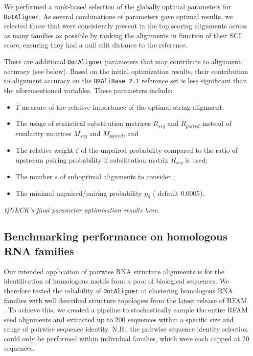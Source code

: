 \documentclass[a4paper,twoside]{article}
\newcommand\dotaligner{\texttt{DotAligner}}
\newcommand\bralibase{\texttt{BRAliBase 2.1}}
\begin{document}
We performed a rank-based selection of the globally optimal parameters for \dotaligner{}. 
As several combinations of parameters gave optimal results, we selected those that were 
consistently present in the top scoring alignments across as many families as possible by 
ranking the alignments in function of their SCI score, ensuring they had a null edit distance 
to the reference.  


There are additional \dotaligner{} parameters that may contribute to alignment 
accuracy (see below). Based on the initial optimization results, their contribution
to alignment accuracy on the \bralibase{} reference set is less significant than the
aforementioned variables. These parameters include: 
\begin{itemize}
	\item $T$ measure of the relative importance of the optimal string alignment.
	\item The usage of statistical substitution matrices $R_{seq}$ and $R_{paired}$ instead of  similarity matrices $M_{seq}$ and $M_{paired}$, and
	\item The relative weight $\zeta$ of the unpaired probability compared to the 
	ratio of upstream pairing probability if substitution matrix $R_{seq}$ is used;
	\item The number $s$ of suboptimal alignments to consider ;
	\item The minimal unpaired/pairing probability $p_0$ ( default 0.0005).
\end{itemize}

\emph{QUECK's final parameter optimisation results here.}

\subsection{Benchmarking performance on homologous RNA families} 

\noindent Our intended application of pairwise RNA structure alignments is 
for the identification of homologous motifs from a pool of biological sequences. 
We therefore tested the reliability of \dotaligner{} at clustering homologous RNA 
families with well described structure topologies from the latest release of RFAM 
\cite{nawrocki2014rfam}. To achieve this, we created a pipeline to stochastically 
sample the entire RFAM seed alignments and extracted up to 200 sequences 
within a specific size and range of pairwise sequence identity. N.B., the pairwise 
sequence identity selection could only be performed within individual families, 
which were each capped at 20 sequences. 
\end{document}
